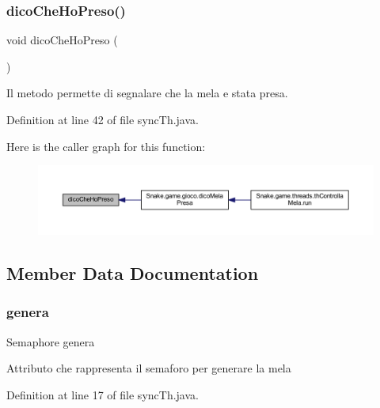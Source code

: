\subsubsection{\texorpdfstring{dico\+Che\+Ho\+Preso()}{dicoCheHoPreso()}}
{\footnotesize\ttfamily void dico\+Che\+Ho\+Preso (\begin{DoxyParamCaption}{ }\end{DoxyParamCaption})}



Il metodo permette di segnalare che la mela e\textquotesingle{} stata presa. 



Definition at line 42 of file sync\+Th.\+java.

Here is the caller graph for this function\+:
\nopagebreak
\begin{figure}[H]
\begin{center}
\leavevmode
\includegraphics[width=350pt]{class_snake_1_1game_1_1utility_1_1sync_th_a56a1409c7c23a1238719bd1dd4430fc7_icgraph}
\end{center}
\end{figure}


\subsection{Member Data Documentation}
\mbox{\label{class_snake_1_1game_1_1utility_1_1sync_th_a7a33fca357e48a689ce6c1924185b710}} 
\subsubsection{\texorpdfstring{genera}{genera}}
{\footnotesize\ttfamily Semaphore genera\hspace{0.3cm}{\ttfamily [private]}}

Attributo che rappresenta il semaforo per generare la mela 

Definition at line 17 of file sync\+Th.\+java.

